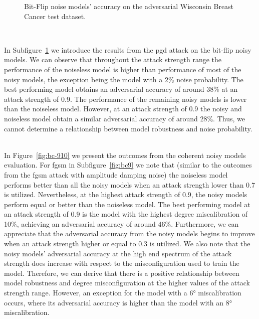 \begin{figure}[!h]
\begin{subfigure}{0.45\textwidth}
      \label{fig:bc8}
  \end{subfigure}
  \caption{Bit-Flip noise models' accuracy on the adversarial Wisconsin Breast Cancer test dataset.}
  \label{fig:bc-78}
\end{figure} \

In Subfigure~\ref{fig:bc8} we introduce the results from the \ac{pgd}
attack on the bit-flip noisy models. We can observe that throughout
the attack strength range the performance of the noiseless model is
higher than performance of most of the noisy models, the exception
being the model with a 2\% noise probability. The best performing
model obtains an adversarial accuracy of around 38\% at an attack
strength of 0.9. The performance of the remaining noisy models is lower
than the noiseless model. However, at an attack strength of 0.9 the noisy
and noiseless model obtain a similar adversarial accuracy of around
28\%. Thus, we cannot determine a relationship between model robustness
and noise probability. \

In Figure~\ref{fig:bc-910} we present the outcomes from the coherent
noisy models evaluation. For \ac{fgsm} in Subfigure~\ref{fig:bc9}
we note that (similar to the outcomes from the \ac{fgsm} attack
with amplitude damping noise) the noiseless model performs better than all the
noisy models when an attack strength lower than 0.7 is utilized.
Nevertheless, at the highest attack strength of 0.9, the noisy
models perform equal or better than the noiseless model. The
best performing model at an attack strength of 0.9 is the model
with the highest degree miscalibration of 10\%, achieving an adversarial
accuracy of around 46\%. Furthermore, we can appreciate that the adversarial
accuracy from the noisy models begins to improve when an attack strength
higher or equal to 0.3 is utilized. We also note that the noisy models'
adversarial accuracy at the high end spectrum of the attack
strength does increase with respect to the misconfiguration
used to train the model. Therefore, we can derive that there
is a positive relationship between model robustness and degree
misconfiguration at the higher values of the attack strength
range. However, an exception for the model with a 6° miscalibration
occurs, where its adversarial accuracy is higher than the model
with an 8° miscalibration. \

